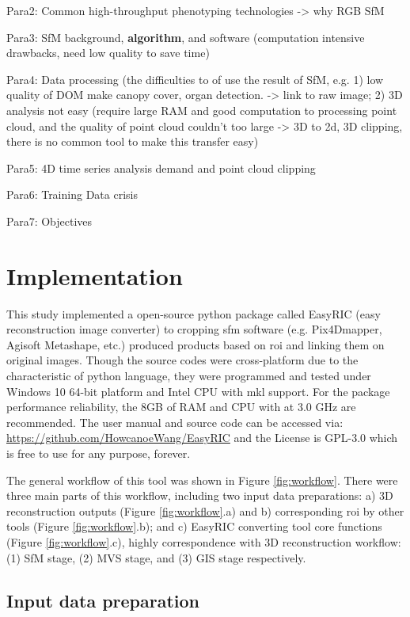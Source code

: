 \documentclass{configs/bmcart}
\begin{document}
Para2: Common high-throughput phenotyping technologies -> why RGB SfM

Para3: SfM background, \textbf{algorithm}, and software (computation intensive drawbacks, need low quality to save time)

Para4: Data processing (the difficulties to of use the result of SfM, e.g. 1) low quality of DOM make canopy cover, organ detection. -> link to raw image; 2) 3D analysis not easy (require large RAM and good computation to processing point cloud, and the quality of point cloud couldn't too large -> 3D to 2d, 3D clipping, there is no common tool to make this transfer easy)

Para5: 4D time series analysis demand and point cloud clipping

Para6: Training Data crisis

Para7: Objectives

\section*{Implementation}

This study implemented a open-source python package called EasyRIC (easy reconstruction image converter) to cropping \acrshort*{sfm} software (e.g. Pix4Dmapper, Agisoft Metashape, etc.) produced products based on \acrfull*{roi} and linking them on original images. Though the source codes were cross-platform due to the characteristic of python language, they were programmed and tested under Windows 10 64-bit platform and Intel CPU with \acrfull*{mkl} support. For the package performance reliability, the 8GB of RAM and CPU with at 3.0 GHz are recommended. The user manual and source code can be accessed via: \url{https://github.com/HowcanoeWang/EasyRIC} and the License is GPL-3.0 which is free to use for any purpose, forever.

The general workflow of this tool was shown in Figure \ref{fig:workflow}. There were three main parts of this workflow, including two input data preparations: a) 3D reconstruction outputs (Figure \ref{fig:workflow}.a) and b) corresponding \acrfull*{roi} by other tools (Figure \ref{fig:workflow}.b); and c) EasyRIC converting tool core functions (Figure \ref{fig:workflow}.c), highly correspondence with 3D reconstruction workflow: (1) SfM stage, (2) MVS stage, and (3) GIS stage respectively. 

\subsection*{Input data preparation}
\end{document}
